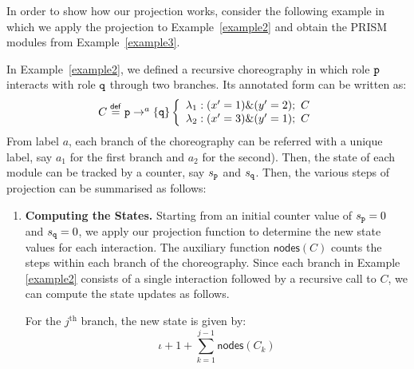\begin{example}\label{example-proj}
  In order to show how our projection works, consider the following
  example in which we apply the projection to Example~\ref{example2}
  and obtain the PRISM modules from Example~\ref{example3}.
  
  In Example \ref{example2}, we defined a recursive choreography in
  which role \(\mathtt{p}\) interacts with role \(\mathtt{q}\) through two
  branches. Its annotated form can be written as:
  \begin{displaymath}
    \begin{array}{lll}
      C \stackrel{\mathsf{def}}{=} \mathtt{p}\rightarrow^{a} \{\mathtt{q}\}
      \left\{
      \begin{array}{lll}
        \lambda_1: (x'=1)\&(y'=2);\ C
        \\
        \lambda_2: (x'=3)\&(y'=1);\ C
      \end{array}
      \right.
    \end{array}
  \end{displaymath}
  From label $a$, each branch of the choreography can be referred with
  a unique label, say \(a_1\) for the first branch and \(a_2\) for the
  second). Then, the state of each module can be tracked by a counter,
  say \(s_{\mathtt{p}}\) and \(s_{\mathtt{q}}\).
  Then, the various steps of projection can be summarised as follows:
  \begin{enumerate}
  \item \textbf{Computing the States.} Starting from an initial
    counter value of \( s_{\mathtt{p}} = 0 \) and
    \( s_{\mathtt{q}} = 0 \), we apply our projection function to
    determine the new state values for each interaction. The auxiliary
    function \(\mathsf{nodes}(C)\) counts the steps within each branch
    of the choreography. Since each branch in Example \ref{example2}
    consists of a single interaction followed by a recursive call to
    \(C\), we can compute the state updates as follows.
 
    For the \(j^{\text{th}}\) branch, the new state is given by:
    \[
      \iota + 1 + \sum_{k=1}^{j-1} \mathsf{nodes}(C_k)
    \]
 

\end{enumerate}
\end{example}
